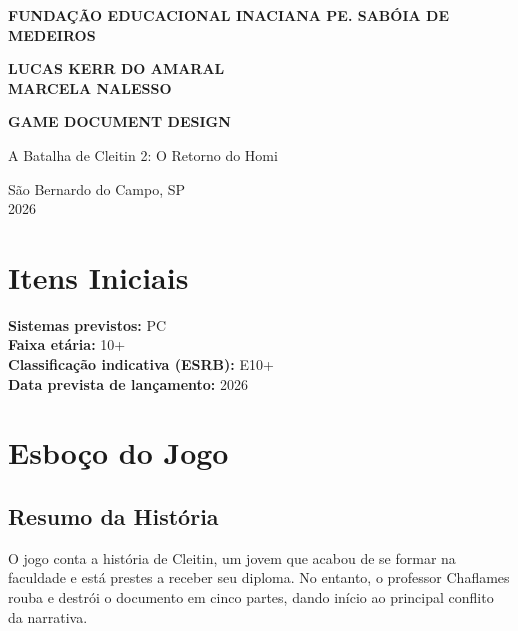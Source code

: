 \documentclass[12pt,a4paper]{article}
\begin{document}
\thispagestyle{empty} 

\begin{center}

\textbf{FUNDAÇÃO EDUCACIONAL INACIANA PE. SABÓIA DE MEDEIROS}

\vspace{3cm}

\textbf{LUCAS KERR DO AMARAL} \\
\textbf{MARCELA NALESSO}

\vfill

\textbf{GAME DOCUMENT DESIGN}

\vspace{0.5cm}

A Batalha de Cleitin 2: O Retorno do Homi

\vfill

São Bernardo do Campo, SP \\
2026

\end{center}

\newpage

\section*{Itens Iniciais}

\textbf{Sistemas previstos:} PC \\[0.3cm]
\textbf{Faixa etária:} 10+ \\[0.3cm]
\textbf{Classificação indicativa (ESRB):} E10+ \\[0.3cm]
\textbf{Data prevista de lançamento:} 2026 \\[2cm]


\newpage


\section*{Esboço do Jogo}

\subsection*{Resumo da História}

O jogo conta a história de Cleitin, um jovem que acabou de se formar na faculdade e está prestes a receber seu diploma. No entanto, o professor Chaflames rouba e destrói o documento em cinco partes, dando início ao principal conflito da narrativa.
\end{document}
